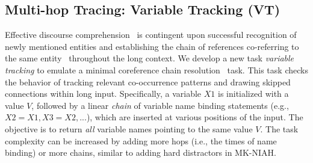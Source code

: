 \subsection{Multi-hop Tracing: Variable Tracking (VT)} 

Effective discourse comprehension~\citep{dijkdiscourse} is contingent upon successful recognition of newly mentioned entities and establishing the chain of references co-referring to the same entity~\citep{discourse-referents} throughout the long context. We develop a new task \emph{variable tracking} to emulate a minimal coreference chain resolution~\citep{ng-2010-supervised} task. This task checks the behavior of tracking relevant co-occurrence patterns and drawing skipped connections within long input. Specifically, a variable $X1$ is initialized with a value $V$, followed by a linear \emph{chain} of variable name binding statements (e.g., $X2 = X1, X3 = X2, ...$), which are inserted at various positions of the input. The objective is to return \emph{all} variable names pointing to the same value $V$. The task complexity can be increased by adding more hops (i.e., the times of name binding) or more chains, similar to adding hard distractors in MK-NIAH. 


